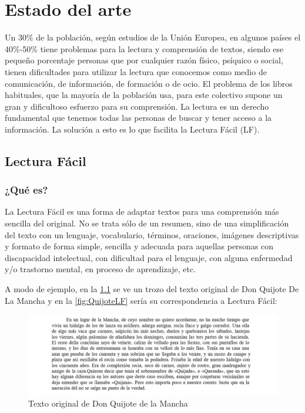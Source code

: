 \chapter{Estado del arte}
\label{cap:estadoDeLaCuestion}

Un 30\% de la población, según estudios de la Unión Europea, en algunos países el 40\%-50\% tiene problemas para la lectura y comprensión de textos, siendo ese pequeño porcentaje personas que por cualquier razón físico, psíquico o social, tienen dificultades para utilizar la lectura que conocemos como medio de comunicación, de información, de formación o de ocio. El problema de los libros habituales, que la mayoría de la población usa, para este colectivo supone un gran y dificultoso esfuerzo para su comprensión. La lectura es un derecho fundamental que tenemos todas las personas de buscar y tener acceso a la información. La solución a esto es lo que facilita la Lectura Fácil (LF).



\section{Lectura Fácil}

\subsection{¿Qué es?}
La Lectura Fácil es una forma de adaptar textos para una comprensión más sencilla del original. No se trata sólo de un resumen, sino de una simplificación del texto con un lenguaje, vocabulario, términos, oraciones, imágenes descriptivas y formato de forma simple, sencilla y adecuada para aquellas personas con discapacidad intelectual, con dificultad para el lenguaje, con alguna enfermedad y/o trastorno mental, en proceso de aprendizaje, etc.

 \setlength{\parskip}{10pt}
 
A modo de ejemplo, en la \ref{fig:Quijote} se ve un trozo del texto original de Don Quijote De La Mancha y en la \ref{fig:QuijoteLF} sería su correspondencia a Lectura Fácil:


\begin{figure}[htb]
	\centering
	\includegraphics[width=1.10\textwidth]{Imagenes/Ejemplos/Cap1DonQuijote}
	\caption{Texto original de Don Quijote de la Mancha}
	\label{fig:Quijote}
\end{figure} 


